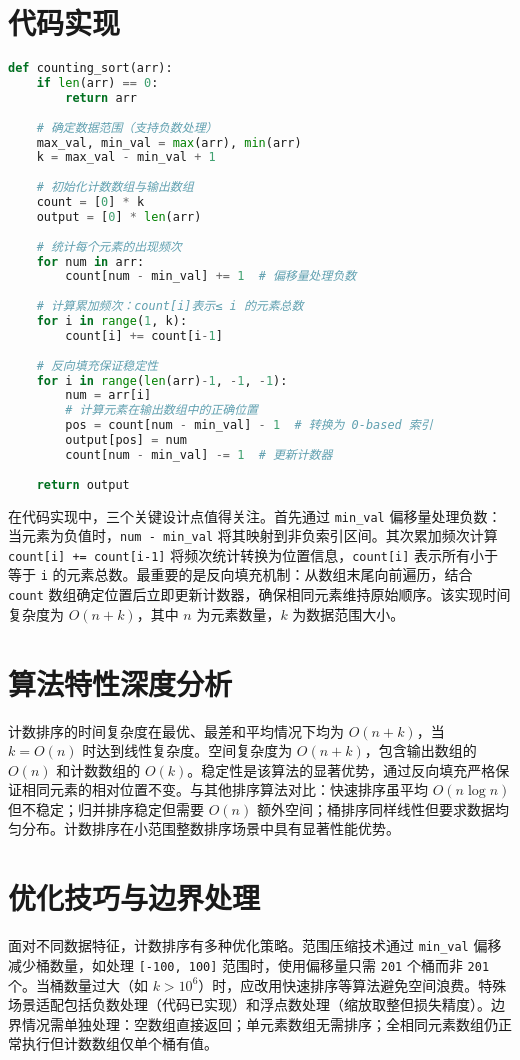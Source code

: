 \chapter{代码实现}
\begin{lstlisting}[language=python]
def counting_sort(arr):
    if len(arr) == 0:
        return arr
    
    # 确定数据范围（支持负数处理）
    max_val, min_val = max(arr), min(arr)
    k = max_val - min_val + 1
    
    # 初始化计数数组与输出数组
    count = [0] * k
    output = [0] * len(arr)
    
    # 统计每个元素的出现频次
    for num in arr:
        count[num - min_val] += 1  # 偏移量处理负数
    
    # 计算累加频次：count[i]表示≤ i 的元素总数
    for i in range(1, k):
        count[i] += count[i-1]
    
    # 反向填充保证稳定性
    for i in range(len(arr)-1, -1, -1):
        num = arr[i]
        # 计算元素在输出数组中的正确位置
        pos = count[num - min_val] - 1  # 转换为 0-based 索引
        output[pos] = num
        count[num - min_val] -= 1  # 更新计数器
    
    return output
\end{lstlisting}
在代码实现中，三个关键设计点值得关注。首先通过 \texttt{min\_{}val} 偏移量处理负数：当元素为负值时，\texttt{num - min\_{}val} 将其映射到非负索引区间。其次累加频次计算 \texttt{count[i] += count[i-1]} 将频次统计转换为位置信息，\texttt{count[i]} 表示所有小于等于 \texttt{i} 的元素总数。最重要的是反向填充机制：从数组末尾向前遍历，结合 \texttt{count} 数组确定位置后立即更新计数器，确保相同元素维持原始顺序。该实现时间复杂度为 $O(n + k)$，其中 $n$ 为元素数量，$k$ 为数据范围大小。\par
\chapter{算法特性深度分析}
计数排序的时间复杂度在最优、最差和平均情况下均为 $O(n + k)$，当 $k = O(n)$ 时达到线性复杂度。空间复杂度为 $O(n + k)$，包含输出数组的 $O(n)$ 和计数数组的 $O(k)$。稳定性是该算法的显著优势，通过反向填充严格保证相同元素的相对位置不变。与其他排序算法对比：快速排序虽平均 $O(n \log{n})$ 但不稳定；归并排序稳定但需要 $O(n)$ 额外空间；桶排序同样线性但要求数据均匀分布。计数排序在小范围整数排序场景中具有显著性能优势。\par
\chapter{优化技巧与边界处理}
面对不同数据特征，计数排序有多种优化策略。范围压缩技术通过 \texttt{min\_{}val} 偏移减少桶数量，如处理 \texttt{[-100, 100]} 范围时，使用偏移量只需 \texttt{201} 个桶而非 \texttt{201} 个。当桶数量过大（如 $k > 10^6$）时，应改用快速排序等算法避免空间浪费。特殊场景适配包括负数处理（代码已实现）和浮点数处理（缩放取整但损失精度）。边界情况需单独处理：空数组直接返回；单元素数组无需排序；全相同元素数组仍正常执行但计数数组仅单个桶有值。\par
